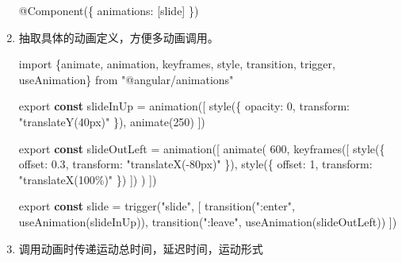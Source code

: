 \documentclass[
]{article}
\newenvironment{Shaded}{}{}
\newcommand{\DataTypeTok}[1]{\textcolor[rgb]{0.56,0.13,0.00}{#1}}
\newcommand{\DecValTok}[1]{\textcolor[rgb]{0.25,0.63,0.44}{#1}}
\newcommand{\FloatTok}[1]{\textcolor[rgb]{0.25,0.63,0.44}{#1}}
\newcommand{\FunctionTok}[1]{\textcolor[rgb]{0.02,0.16,0.49}{#1}}
\newcommand{\ImportTok}[1]{#1}
\newcommand{\KeywordTok}[1]{\textcolor[rgb]{0.00,0.44,0.13}{\textbf{#1}}}
\newcommand{\NormalTok}[1]{#1}
\newcommand{\OperatorTok}[1]{\textcolor[rgb]{0.40,0.40,0.40}{#1}}
\newcommand{\StringTok}[1]{\textcolor[rgb]{0.25,0.44,0.63}{#1}}
\begin{document}
\begin{enumerate}
\begin{Shaded}
\begin{Highlighting}[]
\NormalTok{@}\FunctionTok{Component}\NormalTok{(\{}
  \DataTypeTok{animations}\OperatorTok{:}\NormalTok{ [slide]}
\NormalTok{\})}
\end{Highlighting}
\end{Shaded}
\item
  抽取具体的动画定义，方便多动画调用。

\begin{Shaded}
\begin{Highlighting}[]
\ImportTok{import}\NormalTok{ \{animate}\OperatorTok{,}\NormalTok{ animation}\OperatorTok{,}\NormalTok{ keyframes}\OperatorTok{,}\NormalTok{ style}\OperatorTok{,}\NormalTok{ transition}\OperatorTok{,}\NormalTok{ trigger}\OperatorTok{,}\NormalTok{ useAnimation\} }\ImportTok{from} \StringTok{"@angular/animations"}

\ImportTok{export} \KeywordTok{const}\NormalTok{ slideInUp }\OperatorTok{=} \FunctionTok{animation}\NormalTok{([}
  \FunctionTok{style}\NormalTok{(\{ }\DataTypeTok{opacity}\OperatorTok{:} \DecValTok{0}\OperatorTok{,} \DataTypeTok{transform}\OperatorTok{:} \StringTok{"translateY(40px)"}\NormalTok{ \})}\OperatorTok{,}
  \FunctionTok{animate}\NormalTok{(}\DecValTok{250}\NormalTok{)}
\NormalTok{])}

\ImportTok{export} \KeywordTok{const}\NormalTok{ slideOutLeft }\OperatorTok{=} \FunctionTok{animation}\NormalTok{([}
  \FunctionTok{animate}\NormalTok{(}
    \DecValTok{600}\OperatorTok{,}
    \FunctionTok{keyframes}\NormalTok{([}
      \FunctionTok{style}\NormalTok{(\{ }\DataTypeTok{offset}\OperatorTok{:} \FloatTok{0.3}\OperatorTok{,} \DataTypeTok{transform}\OperatorTok{:} \StringTok{"translateX({-}80px)"}\NormalTok{ \})}\OperatorTok{,}
      \FunctionTok{style}\NormalTok{(\{ }\DataTypeTok{offset}\OperatorTok{:} \DecValTok{1}\OperatorTok{,} \DataTypeTok{transform}\OperatorTok{:} \StringTok{"translateX(100\%)"}\NormalTok{ \})}
\NormalTok{    ])}
\NormalTok{  )}
\NormalTok{])}

\ImportTok{export} \KeywordTok{const}\NormalTok{ slide }\OperatorTok{=} \FunctionTok{trigger}\NormalTok{(}\StringTok{"slide"}\OperatorTok{,}\NormalTok{ [}
  \FunctionTok{transition}\NormalTok{(}\StringTok{":enter"}\OperatorTok{,} \FunctionTok{useAnimation}\NormalTok{(slideInUp))}\OperatorTok{,}
  \FunctionTok{transition}\NormalTok{(}\StringTok{":leave"}\OperatorTok{,} \FunctionTok{useAnimation}\NormalTok{(slideOutLeft))}
\NormalTok{])}
\end{Highlighting}
\end{Shaded}
\item
  调用动画时传递运动总时间，延迟时间，运动形式


\end{enumerate}
\end{document}
